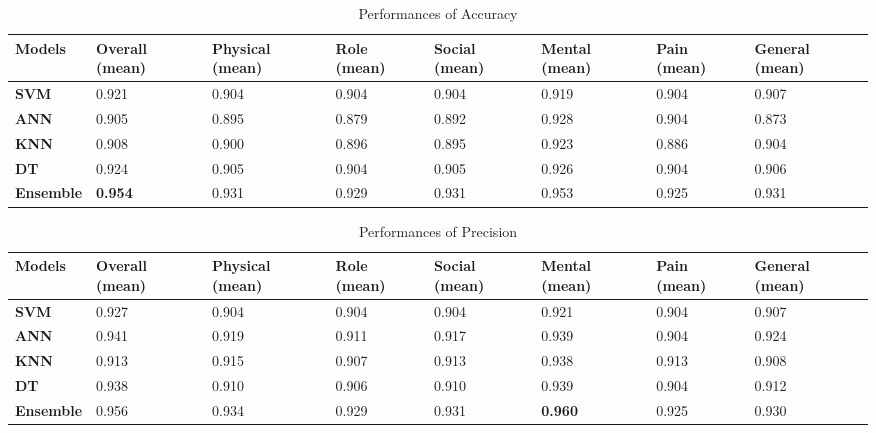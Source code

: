 \documentclass[12pt]{article}
\begin{document}
\begin{table}[ht]
\begin{adjustwidth}{-1.5cm}{}
\begin{tabular}{|C{2cm}|C{1.5cm}|C{2cm}|C{1.5cm}|C{1.5cm}|C{1.5cm}|C{1.5cm}|C{2cm}|}
\hline
{} 
{\color[HTML]{333333} \textbf{Models}} & {\color[HTML]{333333} \textbf{Overall (mean)}} & {\color[HTML]{333333} \textbf{Physical (mean)}} & {\color[HTML]{333333} \textbf{Role (mean)}} &{\color[HTML]{333333} \textbf{Social (mean)}} & {\color[HTML]{333333} \textbf{Mental (mean)}} & {\color[HTML]{333333} \textbf{Pain (mean)}} & {\color[HTML]{333333} \textbf{General (mean)}} \\ \hline
{} 
\textbf{SVM} & 0.921  &0.904 & 0.904 & 0.904 & 0.919 & 0.904  & 0.907  \\ \hline
{} 
\textbf{ANN} & 0.905 & 0.895 & 0.879 & 0.892 & 0.928 & 0.904 & 0.873 \\ \hline
{} 
\textbf{KNN} & 0.908  & 0.900 & 0.896 & 0.895 & 0.923 & 0.886 & 0.904 \\ \hline
{} 
\textbf{DT} & 0.924 & 0.905 & 0.904  & 0.905 & 0.926 & 0.904 & 0.906 \\ \hline
{} 
\textbf{Ensemble} & \textbf{0.954} & 0.931 & 0.929  & 0.931  & 0.953 & 0.925 & 0.931  \\ \hline
\end{tabular}
\caption{Performances of Accuracy}
\label{Accuracy}
\end{adjustwidth}
\end{table}
\begin{table}[ht]
\begin{adjustwidth}{-1.5cm}{}
\begin{tabular}{|C{2cm}|C{1.5cm}|C{2cm}|C{1.5cm}|C{1.5cm}|C{1.5cm}|C{1.5cm}|C{2cm}|}
\hline
{} 
{\color[HTML]{333333} \textbf{Models}} & {\color[HTML]{333333} \textbf{Overall (mean)}} & {\color[HTML]{333333} \textbf{Physical (mean)}} & {\color[HTML]{333333} \textbf{Role (mean)}} &{\color[HTML]{333333} \textbf{Social (mean)}} & {\color[HTML]{333333} \textbf{Mental (mean)}} & {\color[HTML]{333333} \textbf{Pain (mean)}} & {\color[HTML]{333333} \textbf{General (mean)}} \\ \hline
{} 
\textbf{SVM} & 0.927 & 0.904 & 0.904  & 0.904  & 0.921  & 0.904  & 0.907  \\ \hline
{} 
\textbf{ANN}   & 0.941   & 0.919   & 0.911  & 0.917   & 0.939 & 0.904 & 0.924 \\ \hline
{} 
\textbf{KNN} & 0.913 & 0.915 & 0.907  & 0.913 & 0.938 & 0.913  & 0.908  \\ \hline
{} 
\textbf{DT} & 0.938  & 0.910  & 0.906   & 0.910  & 0.939 & 0.904  & 0.912   \\ \hline
{} 
\textbf{Ensemble} & 0.956  & 0.934  & 0.929 & 0.931  & \textbf{0.960}  & 0.925 & 0.930 \\ \hline
\end{tabular}
\caption{Performances of Precision}
\label{Precision}
\end{adjustwidth}
\end{table}
\end{document}
